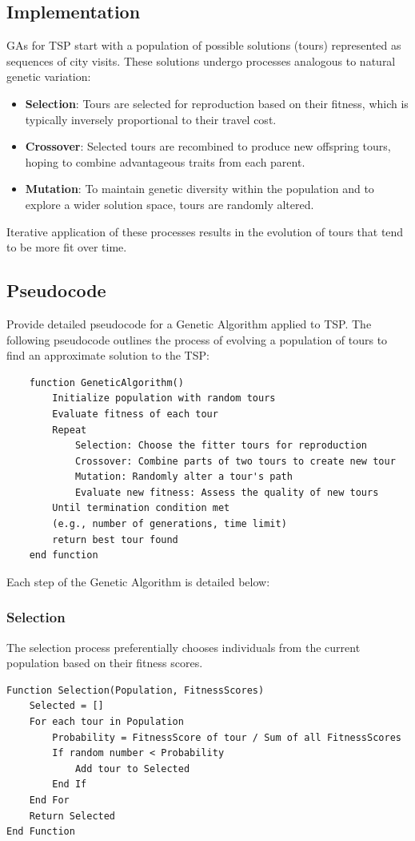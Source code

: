\documentclass[12pt, a4paper]{article}
\begin{document}
\subsection{Implementation}
GAs for TSP start with a population of possible solutions (tours) represented as
sequences of city visits. These solutions undergo processes analogous to natural
genetic variation\cite{article}: 
\begin{itemize}
    \item \textbf{Selection}: Tours are selected for reproduction based on their
    fitness, which is typically inversely proportional to their travel cost.
    \item \textbf{Crossover}: Selected tours are recombined to produce new
    offspring tours, hoping to combine advantageous traits from each parent.
    \item \textbf{Mutation}: To maintain genetic diversity within the population
    and to explore a wider solution space, tours are randomly altered. 
\end{itemize}
Iterative application of these processes results in the evolution of tours that
tend to be more fit over time.


\subsection{Pseudocode}
Provide detailed pseudocode for a Genetic Algorithm applied to TSP. The
following pseudocode outlines the process of evolving a population of tours to
find an approximate solution to the TSP:

\begin{verbatim}
    function GeneticAlgorithm()
        Initialize population with random tours
        Evaluate fitness of each tour
        Repeat
            Selection: Choose the fitter tours for reproduction
            Crossover: Combine parts of two tours to create new tour
            Mutation: Randomly alter a tour's path
            Evaluate new fitness: Assess the quality of new tours
        Until termination condition met 
        (e.g., number of generations, time limit)
        return best tour found
    end function
\end{verbatim}
    

Each step of the Genetic Algorithm is detailed below:

\subsubsection*{Selection}
The selection process preferentially chooses individuals from the current
population based on their fitness scores.
\begin{verbatim}
Function Selection(Population, FitnessScores)
    Selected = []
    For each tour in Population
        Probability = FitnessScore of tour / Sum of all FitnessScores
        If random number < Probability
            Add tour to Selected
        End If
    End For
    Return Selected
End Function
\end{verbatim}
\end{document}
